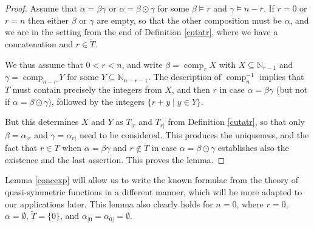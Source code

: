 \documentclass{article}
\theoremstyle{definition}
\begin{document}
\begin{proof}
Assume that $\alpha=\beta\gamma$ or $\alpha=\beta\odot\gamma$ for some $\beta \vDash r$ and $\gamma \vDash n-r$. If $r=0$ or $r=n$ then either $\beta$ or $\gamma$ are empty, so that the other composition must be $\alpha$, and we are in the setting from the end of Definition \ref{cutatr}, where we have a concatenation and $r\in\tilde{T}$.

We thus assume that $0<r<n$, and write $\beta=\operatorname{comp}_{r}X$ with $X\subseteq\mathbb{N}_{r-1}$ and $\gamma=\operatorname{comp}_{n-r}Y$ for some $Y\subseteq\mathbb{N}_{n-r-1}$. The description of $\operatorname{comp}_{n}^{-1}$ implies that $T$ must contain precisely the integers from $X$, and then $r$ in case $\alpha=\beta\gamma$ (but not if $\alpha=\beta\odot\gamma$), followed by the integers $\{r+y\;|\;y \in Y\}$.

But this determines $X$ and $Y$ as $T_{|r}$ and $T_{r|}$ from Definition \ref{cutatr}, so that only $\beta=\alpha_{|r}$ and $\gamma=\alpha_{r|}$ need to be considered. This produces the uniqueness, and the fact that $r \in T$ when $\alpha=\beta\gamma$ and $r \not\in T$ in case $\alpha=\beta\odot\gamma$ establishes also the existence and the last assertion. This proves the lemma.
\end{proof}
Lemma \ref{concexp} will allow us to write the known formulae from the theory of quasi-symmetric functions in a different manner, which will be more adapted to our applications later. This lemma also clearly holds for $n=0$, where $r=0$, $\alpha=\emptyset$, $\tilde{T}=\{0\}$, and $\alpha_{|0}=\alpha_{0|}=\emptyset$.
\end{document}
